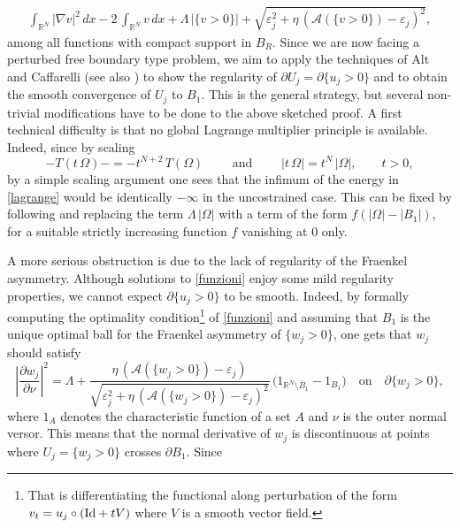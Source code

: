 \documentclass{amsart}
\theoremstyle{definition}
\numberwithin{equation}{section}
\begin{document}
\begin{equation}
\label{funzioni}
\begin{split}
\int_{\mathbb{R}^N} |\nabla v|^2\,dx -2\,\int_{\mathbb{R}^N} v\, dx +\Lambda\,\big |\{v>0\}\big|+\sqrt{\varepsilon_j^2+\eta\,(\mathcal A(\{v>0\})-\varepsilon_j)^2},
\end{split}
\end{equation}
among all functions with compact support in $B_R$.
Since we are now facing a perturbed free boundary type problem, we aim to apply the techniques of Alt and Caffarelli \cite{MR0618549} (see also \cite{MR2084257,MR2542718}) to show the regularity of \(\partial U_j=\partial\{u_{j}>0\}\) and  to obtain  the smooth convergence of \(U_j\) to \(B_1\).
\vskip 0.2cm
This is the general strategy, but several non-trivial modifications have to be done to the above sketched proof. A first technical difficulty is that no global Lagrange multiplier principle is available. Indeed, since by scaling
\[
-T(t\, \Omega)-=-t^{N+2}\, T(\Omega)\qquad \mbox{ and }\qquad |t\, \Omega|=t^N\, |\Omega|,\qquad t>0,
\]
by a simple scaling argument one sees that the infimum of the energy in \eqref{lagrange} would be identically  \(-\infty\) in the uncostrained case. This can be fixed by following \cite{MR0826512} and
replacing the term \(\Lambda\, |\Omega|\) with a term of the form \(f(|\Omega|-|B_1|)\), for a suitable strictly increasing function $f$ vanishing at \(0\) only. 
\par
A more serious obstruction is due to the lack of regularity of the Fraenkel asymmetry.  Although solutions to \eqref{funzioni} enjoy some mild regularity properties, we cannot expect  \(\partial \{u_j>0\}\) to be smooth.  Indeed, by formally computing the optimality condition\footnote{That is differentiating the functional along  perturbation of the form \(v_t=u_j\circ ({\rm Id}+tV)\) where \(V\) is a smooth vector field.} of \eqref{funzioni} and assuming that \(B_1\) is the unique optimal ball for the Fraenkel asymmetry of \(\{w_j>0\}\), one gets that \(w_j\) should satisfy
\[
\left|\frac{\partial w_j}{\partial \nu}\right|^2=\Lambda+\frac{\eta\,(\mathcal A(\{w_j>0\})-\varepsilon_j)}{\sqrt{\varepsilon_j^2+\eta\,(\mathcal A(\{w_j>0\})-\varepsilon_j)^2}}\,\big(1_{\mathbb{R}^N\setminus \overline B_1}-1_{B_1}\big)\quad \text{on}\quad \partial \{w_j>0\},
\]
where $1_A$ denotes the characteristic function of a set $A$ and $\nu$ is the outer normal versor.
This means that  the normal derivative of \(w_j\) is discontinuous at points where \(U_j=\{w_j>0\}\) crosses \(\partial B_1\). Since 
\end{document}
